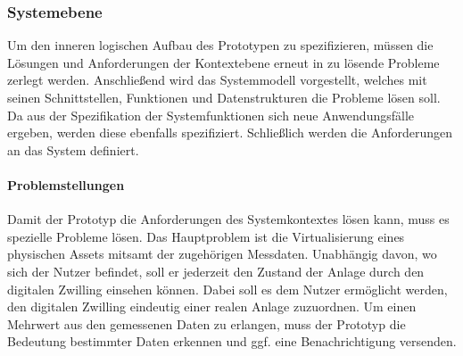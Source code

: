 \subsubsection{Systemebene}
Um den inneren logischen Aufbau des Prototypen zu spezifizieren, müssen die Lösungen und Anforderungen der Kontextebene erneut in zu lösende Probleme zerlegt werden. Anschließend wird das Systemmodell vorgestellt, welches mit seinen Schnittstellen, Funktionen und Datenstrukturen die Probleme lösen soll. Da aus der Spezifikation der Systemfunktionen sich neue Anwendungsfälle ergeben, werden diese ebenfalls spezifiziert. Schließlich werden die Anforderungen an das System definiert.

\paragraph{Problemstellungen} Damit der Prototyp die Anforderungen des Systemkontextes lösen kann, muss es spezielle Probleme lösen. Das Hauptproblem ist die Virtualisierung eines physischen Assets mitsamt der zugehörigen Messdaten. Unabhängig davon, wo sich der Nutzer befindet, soll er jederzeit den Zustand der Anlage durch den digitalen Zwilling einsehen können. Dabei soll es dem Nutzer ermöglicht werden, den digitalen Zwilling eindeutig einer realen Anlage zuzuordnen. Um einen Mehrwert aus den gemessenen Daten zu erlangen, muss der Prototyp die Bedeutung bestimmter Daten erkennen und ggf. eine Benachrichtigung versenden.

